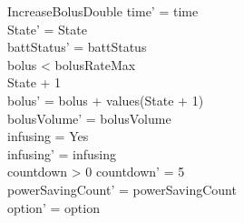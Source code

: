 \begin{schema}{IncreaseBolusDouble}
	time' = time\\ State' = State\\
	battStatus' = battStatus\\
	bolus < bolusRateMax\\
	State + 1 \\
	\pagebreak
	bolus' = bolus + values(State + 1)\\
	bolusVolume' = bolusVolume\\
	infusing = Yes\\
	infusing' = infusing\\
	countdown > 0 \land countdown' = 5\\
	powerSavingCount' = powerSavingCount\\ option' = option\\
\end{schema}

